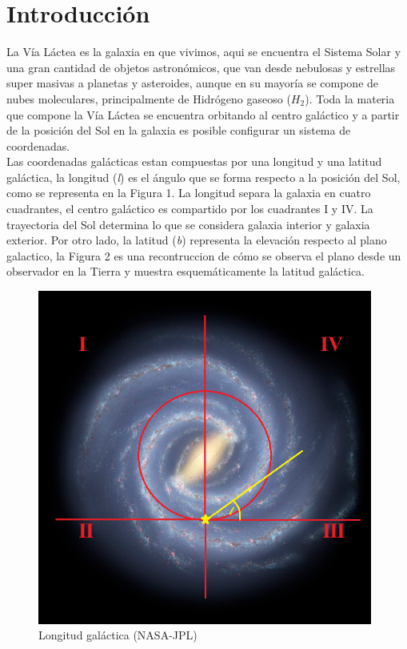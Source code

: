 \documentclass[letterpaper,oneside]{article}
\begin{document}
	
\templatePortrait

\templatePagecfg

\begin{resumen}

\end{resumen}


\templateFinalcfg


\section{Introducción}
La Vía Láctea es la galaxia en que vivimos, aqui se encuentra el Sistema Solar y una gran cantidad de objetos astronómicos, que van desde nebulosas y estrellas super masivas a planetas y asteroides, aunque en su mayoría se compone de nubes moleculares, principalmente de Hidrógeno gaseoso ($H_2$). Toda la materia que compone la Vía Láctea se encuentra orbitando al centro galáctico y a partir de la posición del Sol en la galaxia es posible configurar un sistema de coordenadas.\\

Las coordenadas galácticas estan compuestas por una longitud y una latitud galáctica, la longitud (\emph{l}) es el ángulo que se forma respecto a la posición del Sol, como se representa en la Figura 1. La longitud separa la galaxia en cuatro cuadrantes, el centro galáctico es compartido por los cuadrantes I y IV. La trayectoria del Sol determina lo que se considera galaxia interior y galaxia exterior. Por otro lado, la latitud (\emph{b}) representa la elevación respecto al plano galactico, la Figura 2 es una recontruccion de cómo se observa el plano desde un observador en la Tierra y muestra esquemáticamente la latitud galáctica.

\begin{figure}
  \centering
  \includegraphics[height=11cm]{../graficos/imagenes/coordenadas_galacticas.png}
  \caption{Longitud galáctica  (NASA-JPL)}
\end{figure}
\end{document}
